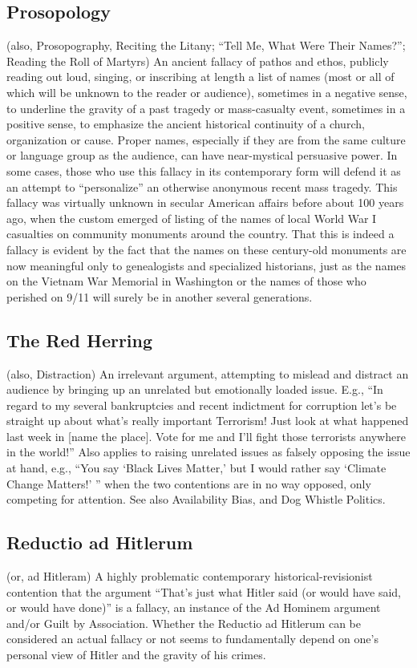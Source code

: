 \documentclass[10pt,a4paper,british]{article}
\begin{document}
\begin{multicols}{2}
    \subsection{Prosopology} (also, Prosopography, Reciting the Litany; ``Tell Me, What Were Their Names?''; Reading the Roll of Martyrs) An ancient fallacy of pathos and ethos, publicly reading out loud, singing, or inscribing at length a list of names (most or all of which will be unknown to the reader or audience), sometimes in a negative sense, to underline the gravity of a past tragedy or mass{-}casualty event, sometimes in a positive sense, to emphasize the ancient historical continuity of a church, organization or cause. Proper names, especially if they are from the same culture or language group as the audience, can have near{-}mystical persuasive power.  In some cases, those who use this fallacy in its contemporary form will defend it as an attempt to ``personalize'' an otherwise anonymous recent mass tragedy. This fallacy was virtually unknown in secular American affairs before about 100 years ago, when the custom emerged of listing of the names of local World War I casualties on community monuments around the country. That this is indeed a fallacy is evident by the fact that the names on these century{-}old monuments are now meaningful only to genealogists and specialized historians, just as the names on the Vietnam War Memorial in Washington or the names of those who perished on 9/11 will surely be in another several generations.  

    \subsection{The Red Herring} (also, Distraction) An irrelevant argument, attempting to mislead and distract an audience by bringing up an unrelated but emotionally loaded issue. E.g., ``In regard to my several bankruptcies and recent indictment for corruption let’s be straight up about what’s really important Terrorism!  Just look at what happened last week in [name the place]. Vote for me and I'll fight those terrorists anywhere in the world!''  Also applies to raising unrelated issues as falsely opposing the issue at hand, e.g., ``You say `Black Lives Matter,' but I would rather say `Climate Change Matters!' '' when the two contentions are in no way opposed, only competing for attention. See also Availability Bias, and Dog Whistle Politics.  

    \subsection{Reductio ad Hitlerum} (or, ad Hitleram) A highly problematic contemporary historical{-}revisionist contention that the argument ``That's just what Hitler said (or would have said, or would have done)'' is a fallacy, an instance of the Ad Hominem argument and/or Guilt by Association. Whether the Reductio ad Hitlerum can be considered an actual fallacy or not seems to fundamentally depend on one's personal view of Hitler and the gravity of his crimes.  


\end{multicols}
\end{document}
